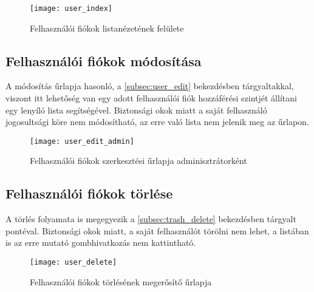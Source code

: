 \begin{figure}[H]
	\centering
	\texttt{[image: user\_index]}
	\caption{Felhasználói fiókok listanézetének felülete}
	\label{fig:user_index}
\end{figure}

\subsection{Felhasználói fiókok módosítása}

A módosítás űrlapja hasonló, a \ref{subsec:user_edit} bekezdésben tárgyaltakkal, viszont itt lehetőség van egy adott felhasználói fiók hozzáférési szintjét állítani egy lenyíló lista segítségével. Biztonsági okok miatt a saját felhasználó jogosultsági köre nem módosítható, az erre való lista nem jelenik meg az űrlapon.

\begin{figure}[H]
	\centering
	\texttt{[image: user\_edit\_admin]}
	\caption{Felhasználói fiókok szerkesztési űrlapja adminisztrátorként}
	\label{fig:user_edit_admin}
\end{figure}

\subsection{Felhasználói fiókok törlése}

A törlés folyamata is megegyezik a \ref{subsec:trash_delete} bekezdésben tárgyalt pontéval. Biztonsági okok miatt, a saját felhasználót törölni nem lehet, a listában is az erre mutató gombhivatkozás nem kattintható.

\begin{figure}[H]
	\centering
	\texttt{[image: user\_delete]}
	\caption{Felhasználói fiókok törlésének megerősítő űrlapja}
	\label{fig:user_delete}
\end{figure}